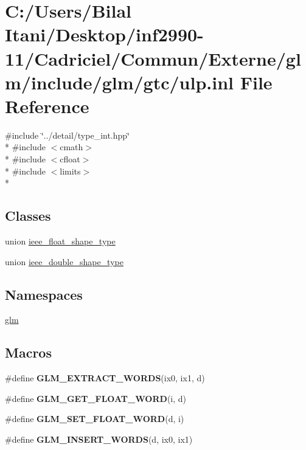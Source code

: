 \hypertarget{ulp_8inl}{}\section{C\+:/\+Users/\+Bilal Itani/\+Desktop/inf2990-\/11/\+Cadriciel/\+Commun/\+Externe/glm/include/glm/gtc/ulp.inl File Reference}
\label{ulp_8inl}
{\ttfamily \#include \char`\"{}../detail/type\+\_\+int.\+hpp\char`\"{}}\\*
{\ttfamily \#include $<$cmath$>$}\\*
{\ttfamily \#include $<$cfloat$>$}\\*
{\ttfamily \#include $<$limits$>$}\\*
\subsection*{Classes}
\begin{DoxyCompactItemize}
\item 
union \hyperlink{unionieee__float__shape__type}{ieee\+\_\+float\+\_\+shape\+\_\+type}
\item 
union \hyperlink{unionieee__double__shape__type}{ieee\+\_\+double\+\_\+shape\+\_\+type}
\end{DoxyCompactItemize}
\subsection*{Namespaces}
\begin{DoxyCompactItemize}
\item 
 \hyperlink{namespaceglm}{glm}
\end{DoxyCompactItemize}
\subsection*{Macros}
\begin{DoxyCompactItemize}
\item 
\#define {\bfseries G\+L\+M\+\_\+\+E\+X\+T\+R\+A\+C\+T\+\_\+\+W\+O\+R\+DS}(ix0,  ix1,  d)
\item 
\#define {\bfseries G\+L\+M\+\_\+\+G\+E\+T\+\_\+\+F\+L\+O\+A\+T\+\_\+\+W\+O\+RD}(i,  d)
\item 
\#define {\bfseries G\+L\+M\+\_\+\+S\+E\+T\+\_\+\+F\+L\+O\+A\+T\+\_\+\+W\+O\+RD}(d,  i)
\item 
\#define {\bfseries G\+L\+M\+\_\+\+I\+N\+S\+E\+R\+T\+\_\+\+W\+O\+R\+DS}(d,  ix0,  ix1)
\end{DoxyCompactItemize}
